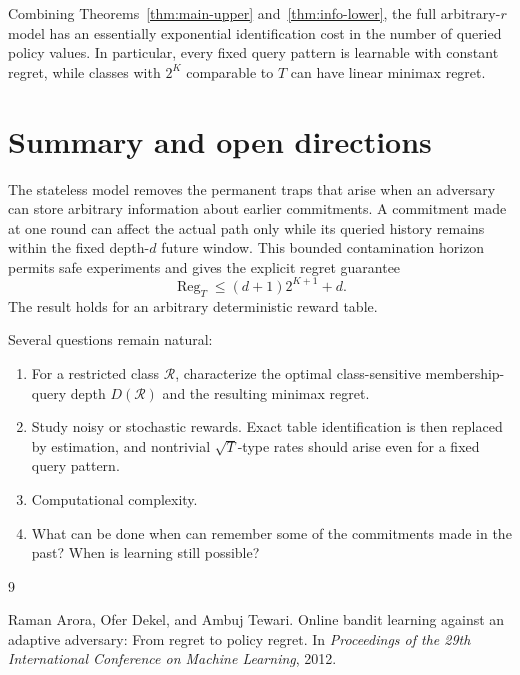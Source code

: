 \documentclass[11pt]{article}
\newcommand{\RR}{\mathcal R}
\newcommand{\Reg}{\operatorname{Reg}}
\begin{document}
Combining Theorems~\ref{thm:main-upper} and~\ref{thm:info-lower}, the full arbitrary-$r$ model has an essentially exponential identification cost in the number of queried policy values.  In particular, every fixed query pattern is learnable with constant regret, while classes with $2^K$ comparable to $T$ can have linear minimax regret.

\section{Summary and open directions}

The stateless model removes the permanent traps that arise when an adversary can store arbitrary information about earlier commitments.  A commitment made at one round can affect the actual path only while its queried history remains within the fixed depth-$d$ future window.  This bounded contamination horizon permits safe experiments and gives the explicit regret guarantee
\[
    \Reg_T
    \leq
    (d+1)2^{K+1}+d.
\]
The result holds for an arbitrary deterministic reward table.

Several questions remain natural:
\begin{enumerate}[label=\arabic*.]
    \item For a restricted class $\RR$, characterize the optimal class-sensitive membership-query depth $D(\RR)$ and the resulting minimax regret.

    \item Study noisy or stochastic rewards.  Exact table identification is then replaced by estimation, and nontrivial $\sqrt{T}$-type rates should arise even for a fixed query pattern.

    \item Computational complexity.

    \item What can be done when can remember some of the commitments made in the past? When is learning still possible?
\end{enumerate}

\begin{thebibliography}{9}

Raman Arora, Ofer Dekel, and Ambuj Tewari.
\newblock Online bandit learning against an adaptive adversary: From regret to policy regret.
\newblock In \emph{Proceedings of the 29th International Conference on Machine Learning}, 2012.

\end{thebibliography}
\end{document}
